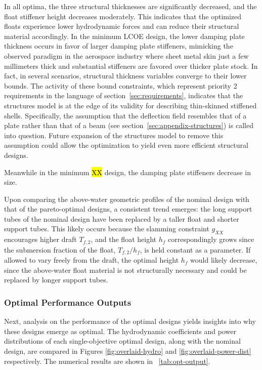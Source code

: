 In all optima, the three structural thicknesses are significantly decreased, and the float stiffener height decreases moderately. This indicates that the optimized floats experience lower hydrodynamic forces and can reduce their structural material accordingly. In the minimum LCOE design, the lower damping plate thickness occurs in favor of larger damping plate stiffeners, mimicking the observed paradigm in the aerospace industry where sheet metal skin just a few millimeters thick and substantial stiffeners are favored over thicker plate stock. In fact, in several scenarios, structural thickness variables converge to their lower bounds. The activity of these bound constraints, which represent priority 2 requirements in the language of section~\ref{sec:requirements}, indicates that the structures model is at the edge of its validity for describing thin-skinned stiffened shells. Specifically, the assumption that the deflection field resembles that of a plate rather than that of a beam (see section~\ref{sec:appendix-structures}) is called into question. Future expansion of the structures model to remove this assumption could allow the optimization to yield even more efficient structural designs.

Meanwhile in the minimum \hl{XX} design, the damping plate stiffeners decrease in size. 


Upon comparing the above-water geometric profiles of the nominal design with that of the pareto-optimal designs, a consistent trend emerges: the long support tubes of the nominal design have been replaced by a taller float and shorter support tubes. This likely occurs because the slamming constraint $g_{XX}$ encourages higher draft $T_{f,2}$, and the float height $h_f$ correspondingly grows since the submersion fraction of the float, $T_{f,2}/h_f$, is held constant as a parameter. If allowed to vary freely from the draft, the optimal height $h_f$ would likely decrease, since the above-water float material is not structurally necessary and could be replaced by longer support tubes.

\subsubsection{Optimal Performance Outputs}
Next, analysis on the performance of the optimal designs yields insights into why these designs emerge as optimal. The hydrodynamic coefficients and power distributions of each single-objective optimal design, along with the nominal design, are compared in Figures \ref{fig:overlaid-hydro} and \ref{fig:overlaid-power-dist} respectively. The numerical results are shown in \tablename~\ref{tab:opt-output}.

